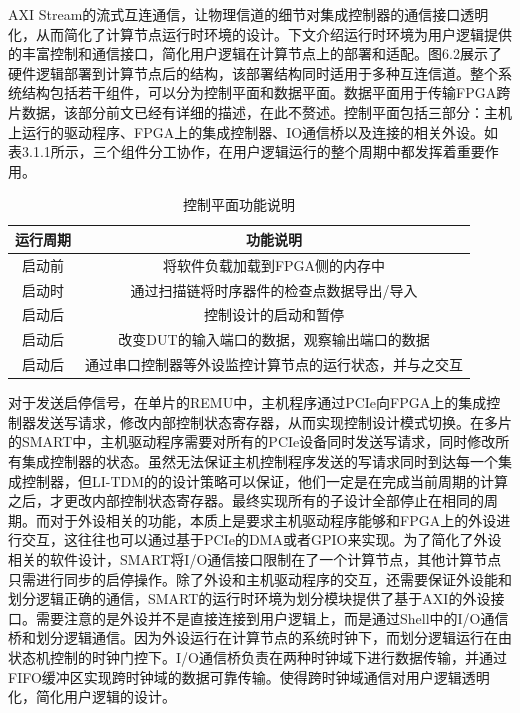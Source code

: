 AXI Stream的流式互连通信，让物理信道的细节对集成控制器的通信接口透明化，从而简化了计算节点运行时环境的设计。下文介绍运行时环境为用户逻辑提供的丰富控制和通信接口，简化用户逻辑在计算节点上的部署和适配。图6.2展示了硬件逻辑部署到计算节点后的结构，该部署结构同时适用于多种互连信道。整个系统结构包括若干组件，可以分为控制平面和数据平面。数据平面用于传输FPGA跨片数据，该部分前文已经有详细的描述，在此不赘述。控制平面包括三部分：主机上运行的驱动程序、FPGA上的集成控制器、IO通信桥以及连接的相关外设。如表3.1.1所示，三个组件分工协作，在用户逻辑运行的整个周期中都发挥着重要作用。

\begin{table}[htb]
    \centering
    \caption{控制平面功能说明}
    \label{tab::control_plane}
    \begin{tabular}{*{2}{c}}
        \toprule
        运行周期 & 功能说明                        \\
        \midrule
        启动前  & 将软件负载加载到FPGA侧的内存中           \\
        启动时  & 通过扫描链将时序器件的检查点数据导出/导入       \\
        启动后  & 控制设计的启动和暂停                  \\
        启动后  & 改变DUT的输入端口的数据，观察输出端口的数据     \\
        启动后  & 通过串口控制器等外设监控计算节点的运行状态，并与之交互 \\
        \bottomrule
    \end{tabular}
\end{table}

对于发送启停信号，在单片的REMU中，主机程序通过PCIe向FPGA上的集成控制器发送写请求，修改内部控制状态寄存器，从而实现控制设计模式切换。在多片的SMART中，主机驱动程序需要对所有的PCIe设备同时发送写请求，同时修改所有集成控制器的状态。虽然无法保证主机控制程序发送的写请求同时到达每一个集成控制器，但LI-TDM的的设计策略可以保证，他们一定是在完成当前周期的计算之后，才更改内部控制状态寄存器。最终实现所有的子设计全部停止在相同的周期。而对于外设相关的功能，本质上是要求主机驱动程序能够和FPGA上的外设进行交互，这往往也可以通过基于PCIe的DMA或者GPIO来实现。为了简化了外设相关的软件设计，SMART将I/O通信接口限制在了一个计算节点，其他计算节点只需进行同步的启停操作。除了外设和主机驱动程序的交互，还需要保证外设能和划分逻辑正确的通信，SMART的运行时环境为划分模块提供了基于AXI的外设接口。需要注意的是外设并不是直接连接到用户逻辑上，而是通过Shell中的I/O通信桥和划分逻辑通信。因为外设运行在计算节点的系统时钟下，而划分逻辑运行在由状态机控制的时钟门控下。I/O通信桥负责在两种时钟域下进行数据传输，并通过FIFO缓冲区实现跨时钟域的数据可靠传输。使得跨时钟域通信对用户逻辑透明化，简化用户逻辑的设计。

